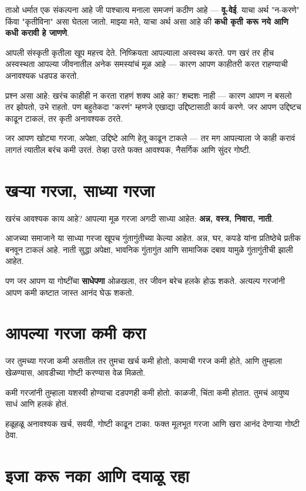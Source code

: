 ताओ धर्मात एक संकल्पना आहे जी पाश्चात्य मनाला समजणं कठीण आहे — \textbf{वू-वेई}.  
याचा अर्थ "न-करणे" किंवा "कृतीविना" असा घेतला जातो.  
माझ्या मते, याचा अर्थ असा आहे की \textbf{कधी कृती करू नये आणि कधी करावी हे जाणणे}.  

आपली संस्कृती कृतीला खूप महत्त्व देते.  
निष्क्रियता आपल्याला अस्वस्थ करते.  
पण खरं तर हीच अस्वस्थता आपल्या जीवनातील अनेक समस्यांचं मूळ आहे —  
कारण आपण काहीतरी करत राहण्याची अनावश्यक धडपड करतो.  

प्रश्न असा आहे: खरंच काहीही न करता राहणं शक्य आहे का?  
शब्दशः नाही — कारण आपण न बसलो तर झोपतो, उभे राहतो.  
पण बहुतेकदा "करणं" म्हणजे एखाद्या उद्दिष्टासाठी कार्य करणे.  
जर आपण उद्दिष्टच काढून टाकलं, तर कृती अनावश्यक ठरते.  

जर आपण खोट्या गरजा, अपेक्षा, उद्दिष्टे आणि हेतू काढून टाकले —  
तर मग आपल्याला जे काही करावं लागतं त्यातील बरंच कमी उरतं.  
तेव्हा उरते फक्त आवश्यक, नैसर्गिक आणि सुंदर गोष्टी.  


\section{खऱ्या गरजा, साध्या गरजा}

खरंच आवश्यक काय आहे?  
आपल्या मूळ गरजा अगदी साध्या आहेत: \textbf{अन्न, वस्त्र, निवारा, नाती}.  

आजच्या समाजाने या साध्या गरजा खूपच गुंतागुंतीच्या केल्या आहेत.  
अन्न, घर, कपडे यांना प्रतिष्ठेचे प्रतीक बनवून टाकलं आहे.  
नाती सुद्धा अपेक्षा, भावनिक गुंतागुंत आणि सामाजिक दबाव यामुळे गुंतागुंतीची झाली आहेत.  

पण जर आपण या गोष्टींचा \textbf{साधेपणा} ओळखला, तर जीवन बरेच हलके होऊ शकते.  
अत्यल्प गरजांनी आपण कमी कष्टात जास्त आनंद घेऊ शकतो.  


\section{आपल्या गरजा कमी करा}

जर तुमच्या गरजा कमी असतील तर तुमचा खर्च कमी होतो,  
कामाची गरज कमी होते, आणि तुम्हाला खेळण्यास, आवडीच्या गोष्टी करण्यास वेळ मिळतो.  

कमी गरजांनी तुम्हाला यशस्वी होण्याचा दडपणही कमी होतो.  
काळजी, चिंता कमी होतात.  
तुमचं आयुष्य साधं आणि हलकं होतं.  

हळूहळू अनावश्यक खर्च, सवयी, गोष्टी काढून टाका.  
फक्त मूलभूत गरजा आणि खरा आनंद देणाऱ्या गोष्टी ठेवा.  

\section{इजा करू नका आणि दयाळू रहा}

